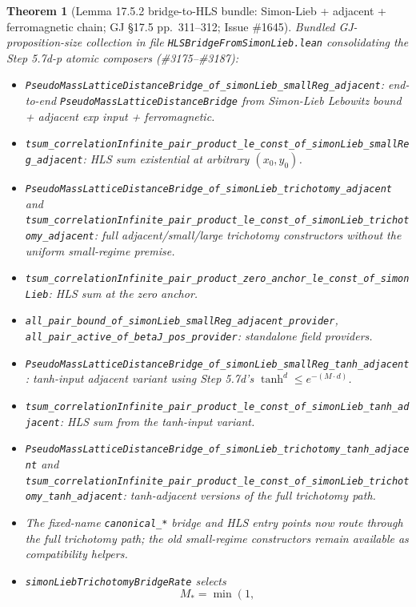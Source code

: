 \documentclass[a4paper,11pt]{article}
\newtheorem{theorem}{Theorem}
\begin{document}
\begin{theorem}[Lemma 17.5.2 bridge-to-HLS bundle: Simon-Lieb + adjacent + ferromagnetic chain;
GJ \S17.5 pp.~311--312; Issue \#1645]
Bundled GJ-proposition-size collection in file
\texttt{HLSBridgeFromSimonLieb.lean} consolidating the Step 5.7d-p atomic
composers (\#3175--\#3187):
\begin{itemize}
  \item \texttt{PseudoMassLatticeDistanceBridge\_of\_simonLieb\_smallReg\_adjacent}:
    end-to-end \texttt{PseudoMassLatticeDistanceBridge} from Simon-Lieb
    Lebowitz bound + adjacent exp input + ferromagnetic.
  \item \texttt{tsum\_correlationInfinite\_pair\_product\_le\_const\_of\_simonLieb\_smallReg\_adjacent}:
    HLS sum existential at arbitrary $(x_0, y_0)$.
  \item \texttt{PseudoMassLatticeDistanceBridge\_of\_simonLieb\_trichotomy\_adjacent}
    and
    \texttt{tsum\_correlationInfinite\_pair\_product\_le\_const\_of\_simonLieb\_trichotomy\_adjacent}:
    full adjacent/small/large trichotomy constructors without the uniform
    small-regime premise.
  \item \texttt{tsum\_correlationInfinite\_pair\_product\_zero\_anchor\_le\_const\_of\_simonLieb}:
    HLS sum at the zero anchor.
  \item \texttt{all\_pair\_bound\_of\_simonLieb\_smallReg\_adjacent\_provider},
    \texttt{all\_pair\_active\_of\_betaJ\_pos\_provider}: standalone
    field providers.
  \item \texttt{PseudoMassLatticeDistanceBridge\_of\_simonLieb\_smallReg\_tanh\_adjacent}:
    tanh-input adjacent variant using Step 5.7d's $\tanh^d \le e^{-(M\cdot d)}$.
  \item \texttt{tsum\_correlationInfinite\_pair\_product\_le\_const\_of\_simonLieb\_tanh\_adjacent}:
    HLS sum from the tanh-input variant.
  \item \texttt{PseudoMassLatticeDistanceBridge\_of\_simonLieb\_trichotomy\_tanh\_adjacent}
    and
    \texttt{tsum\_correlationInfinite\_pair\_product\_le\_const\_of\_simonLieb\_trichotomy\_tanh\_adjacent}:
    tanh-adjacent versions of the full trichotomy path.
  \item The fixed-name \texttt{canonical\_*} bridge and HLS entry points now
    route through the full trichotomy path; the old small-regime constructors
    remain available as compatibility helpers.
  \item \texttt{simonLiebTrichotomyBridgeRate} selects
    \[
      M_\ast = \min\left(1,
\]
\end{itemize}
\end{theorem}
\end{document}
